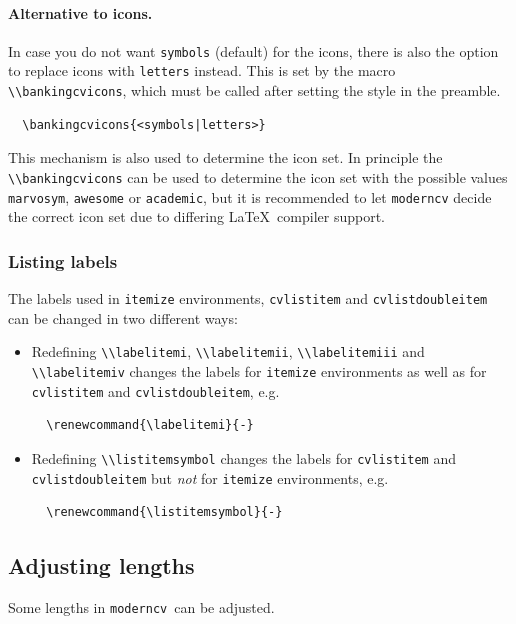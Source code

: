\documentclass[a4paper, 11pt]{article}
\newcommand{\code}[1]{\lstinline!#1!}
\newcommand{\moderncv}{\code{moderncv}}
\newcommand{\Moderncv}{\moderncv~}
\newcommand{\Latex}{\LaTeX~}
\begin{document}
\paragraph{Alternative to icons.}
In case you do not want \texttt{symbols} (default) for the icons, there is also the option to replace icons with \texttt{letters} instead. This is set by the macro \code{\\bankingcvicons}, which must be called after setting the style in the preamble.
\begin{lstlisting}
  \bankingcvicons{<symbols|letters>}
\end{lstlisting}
This mechanism is also used to determine the icon set. In principle the \code{\\bankingcvicons} can be used to determine the icon set with the possible values \texttt{marvosym}, \texttt{awesome} or \texttt{academic}, but it is recommended to let {\moderncv} decide the correct icon set due to differing \Latex compiler support.

\subsubsection{Listing labels}
The labels used in \code{itemize} environments, \code{cvlistitem} and \code{cvlistdoubleitem} can be changed in two different ways:

\begin{itemize}
  \item Redefining \code{\\labelitemi}, \code{\\labelitemii}, \code{\\labelitemiii} and \code{\\labelitemiv} changes the labels for \code{itemize} environments as well as for \code{cvlistitem} and \code{cvlistdoubleitem}, e.g.
  \begin{lstlisting}
  \renewcommand{\labelitemi}{-}
  \end{lstlisting}
  \item Redefining \code{\\listitemsymbol} changes the labels for \code{cvlistitem} and \code{cvlistdoubleitem} but \emph{not} for \code{itemize} environments, e.g.
  \begin{lstlisting}
  \renewcommand{\listitemsymbol}{-}
\end{lstlisting}
\end{itemize}

\subsection{Adjusting lengths}\label{subsection:adjusting:lengths}
Some lengths in \Moderncv can be adjusted.
\end{document}

